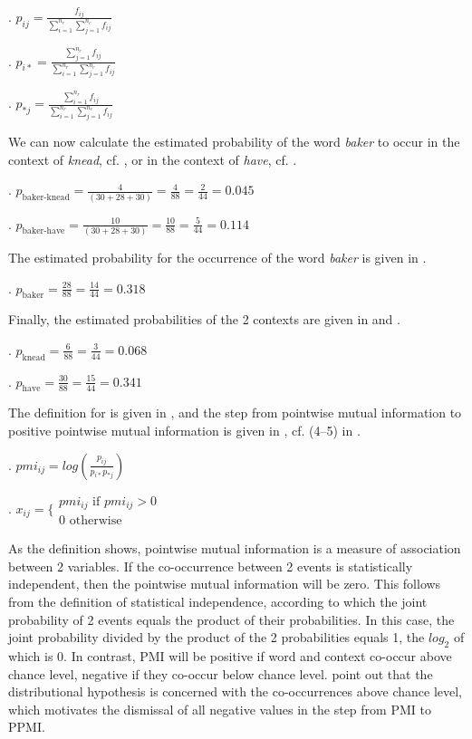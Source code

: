 \ex. \( \displaystyle p_{ij} = \frac{f_{ij}}{\sum^{n_r}_{i=1}\sum^{n_c}_{j=1}f_{ij}} \)

\ex. \( \displaystyle p_{i*}= \frac{\sum^{n_c}_{j=1}f_{ij}}{\sum^{n_r}_{i=1}\sum^{n_c}_{j=1}f_{ij}} \)

\ex. \label{ex:context-prob}
\( \displaystyle p_{*j}= \frac{\sum^{n_r}_{i=1}f_{ij}}{\sum^{n_r}_{i=1}\sum^{n_c}_{j=1}f_{ij}} \)

We can now calculate the estimated probability of the word
\emph{baker} to occur in the context of \emph{knead}, cf. \Next, or in
the context of \emph{have}, cf. \NNext.

\ex. \( \displaystyle p_{\text{baker-knead}} = \frac{4}{(30+28+30)} = \frac{4}{88} =
\frac{2}{44} = 0.045 \)

\ex. \( \displaystyle p_{\text{baker-have}} = \frac{10}{(30+28+30)} = \frac{10}{88} =
\frac{5}{44} = 0.114 \)

The estimated probability for the occurrence of the word
\emph{baker} is given in \Next.

\ex. \( \displaystyle p_{\text{baker}}= \frac{28}{88}= \frac{14}{44}= 0.318 \)

Finally, the estimated probabilities of the 2 contexts are given in \Next and
\NNext.

\ex. \label{ex:context-prob-knead}
\( \displaystyle p_{\text{knead}}= \frac{6}{88}= \frac{3}{44}= 0.068 \) 

\ex. \label{ex:context-prob-have}
\( \displaystyle p_{\text{have}}= \frac{30}{88}= \frac{15}{44}= 0.341 \)

The definition for  is given in \Next, and
the step from pointwise mutual information to positive pointwise
mutual information is given in \NNext, cf. (4--5) in
\citet[157]{TurneyandPantel:2010}.

\ex.  \( \displaystyle pmi_{ij} = log\left(\frac{p_{ij}}{p_{i*}p_{*j}}\right)\)

\ex. \(x_{ij} = \Bigg\{
\begin{array}{c}
  pmi_{ij} \text{ if } pmi_{ij} > 0\\
\text{0 otherwise}
\end{array}
\)
% 

As the definition shows, pointwise mutual information is a measure of
association between 2 variables. If the co-occurrence between 2
events is statistically independent, then the pointwise mutual
information will be zero. This follows from the definition of statistical
independence, according to which the joint probability of 2 events
 equals the product of their probabilities. In this case, the joint
probability divided by the product of the 2  probabilities equals 1,
the $log_2$ of which is 0. In contrast, PMI will be positive if word
and context co-occur above chance level, negative if they co-occur below
chance level. \citet[157]{TurneyandPantel:2010} point out that the
distributional hypothesis is concerned with the co-occurrences above
chance level, which motivates the dismissal of all negative values in
the step from PMI to PPMI.

